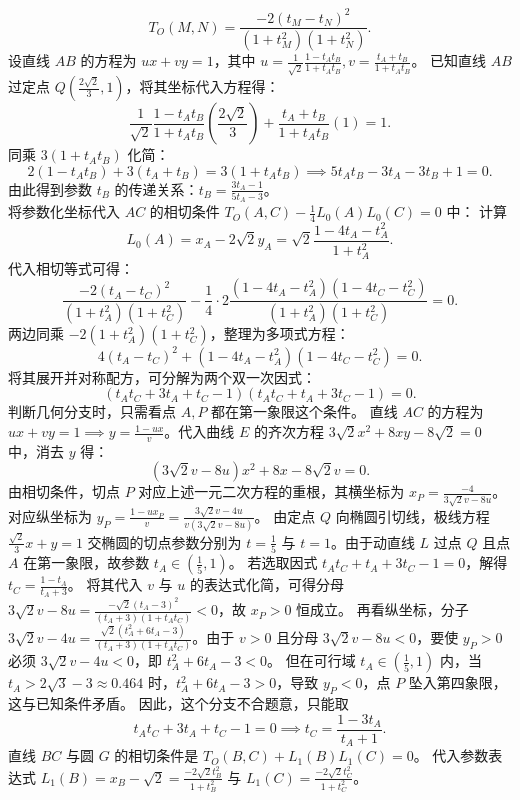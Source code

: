 \begin{solution}
\[ T_O(M, N) = \frac{-2(t_M - t_N)^2}{(1+t_M^2)(1+t_N^2)}. \]
设直线 $AB$ 的方程为 $ux + vy = 1$，其中 $u = \frac{1}{\sqrt{2}} \frac{1-t_A t_B}{1+t_A t_B}, v = \frac{t_A+t_B}{1+t_A t_B}$。
已知直线 $AB$ 过定点 $Q\left(\frac{2\sqrt{2}}{3}, 1\right)$，将其坐标代入方程得：
\[ \frac{1}{\sqrt{2}} \frac{1-t_A t_B}{1+t_A t_B} \left(\frac{2\sqrt{2}}{3}\right) + \frac{t_A+t_B}{1+t_A t_B} (1) = 1. \]
同乘 $3(1 + t_A t_B)$ 化简：
\[ 2(1 - t_A t_B) + 3(t_A + t_B) = 3(1 + t_A t_B) \implies 5t_A t_B - 3t_A - 3t_B + 1 = 0. \]
由此得到参数 $t_B$ 的传递关系：$t_B = \frac{3t_A - 1}{5t_A - 3}$。\\
将参数化坐标代入 $AC$ 的相切条件 $T_O(A, C) - \frac{1}{4}L_0(A)L_0(C) = 0$ 中：
计算
\[
L_0(A) = x_A - 2\sqrt{2} y_A = \sqrt{2} \frac{1 - 4t_A - t_A^2}{1+t_A^2}.
\]
代入相切等式可得：
\[ \frac{-2(t_A - t_C)^2}{(1+t_A^2)(1+t_C^2)} - \frac{1}{4} \cdot 2 \frac{(1-4t_A-t_A^2)(1-4t_C-t_C^2)}{(1+t_A^2)(1+t_C^2)} = 0. \]
两边同乘 $-2(1+t_A^2)(1+t_C^2)$，整理为多项式方程：
\[ 4(t_A - t_C)^2 + (1 - 4t_A - t_A^2)(1 - 4t_C - t_C^2) = 0. \]
将其展开并对称配方，可分解为两个双一次因式：
\[ (t_A t_C + 3t_A + t_C - 1)(t_A t_C + t_A + 3t_C - 1) = 0. \]
判断几何分支时，只需看点 $A, P$ 都在第一象限这个条件。
直线 $AC$ 的方程为 $u x + v y = 1 \implies y = \frac{1-ux}{v}$。代入曲线 $E$ 的齐次方程 $3\sqrt{2}x^2 + 8xy - 8\sqrt{2} = 0$ 中，消去 $y$ 得：
\[ (3\sqrt{2}v - 8u)x^2 + 8x - 8\sqrt{2}v = 0. \]
由相切条件，切点 $P$ 对应上述一元二次方程的重根，其横坐标为 $x_P = \frac{-4}{3\sqrt{2}v - 8u}$。
对应纵坐标为 $y_P = \frac{1 - u x_P}{v} = \frac{3\sqrt{2}v - 4u}{v(3\sqrt{2}v - 8u)}$。
由定点 $Q$ 向椭圆引切线，极线方程 $\frac{\sqrt{2}}{3}x + y = 1$ 交椭圆的切点参数分别为 $t = \frac{1}{5}$ 与 $t = 1$。由于动直线 $L$ 过点 $Q$ 且点 $A$ 在第一象限，故参数 $t_A \in \left(\frac{1}{5}, 1\right)$。
若选取因式 $t_A t_C + t_A + 3t_C - 1 = 0$，解得 $t_C = \frac{1-t_A}{t_A+3}$。
将其代入 $v$ 与 $u$ 的表达式化简，可得分母 $3\sqrt{2}v - 8u = \frac{-\sqrt{2}(t_A-3)^2}{(t_A+3)(1+t_A t_C)} < 0$，故 $x_P > 0$ 恒成立。
再看纵坐标，分子 $3\sqrt{2}v - 4u = \frac{\sqrt{2}(t_A^2+6t_A-3)}{(t_A+3)(1+t_A t_C)}$。由于 $v > 0$ 且分母 $3\sqrt{2}v - 8u < 0$，要使 $y_P > 0$ 必须 $3\sqrt{2}v - 4u < 0$，即 $t_A^2+6t_A-3 < 0$。
但在可行域 $t_A \in \left(\frac{1}{5}, 1\right)$ 内，当 $t_A > 2\sqrt{3}-3 \approx 0.464$ 时，$t_A^2+6t_A-3 > 0$，导致 $y_P < 0$，点 $P$ 坠入第四象限，这与已知条件矛盾。
因此，这个分支不合题意，只能取
\[ t_A t_C + 3t_A + t_C - 1 = 0 \implies t_C = \frac{1-3t_A}{t_A+1}. \]
直线 $BC$ 与圆 $G$ 的相切条件是 $T_O(B, C) + L_1(B)L_1(C) = 0$。
代入参数表达式 $L_1(B) = x_B - \sqrt{2} = \frac{-2\sqrt{2}t_B^2}{1+t_B^2}$ 与 $L_1(C) = \frac{-2\sqrt{2}t_C^2}{1+t_C^2}$。

\end{solution}

